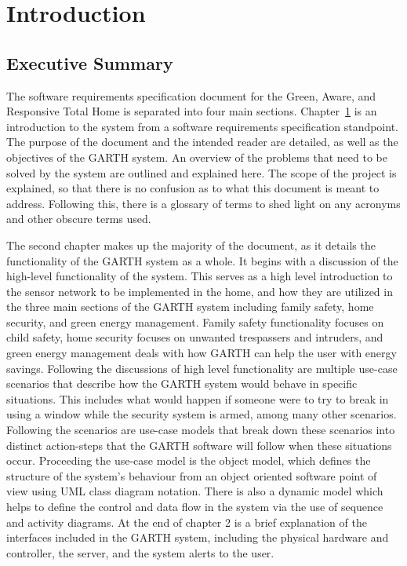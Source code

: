 \documentclass{report}
\begin{document}

\tableofcontents
\listoffigures

\chapter{Introduction}
\label{ch:introduction}
\section{Executive Summary}
The software requirements specification document for the Green, Aware, and
Responsive Total Home is separated into four main sections.
Chapter~\ref{ch:introduction} is an introduction to the system from a software
requirements specification standpoint. The purpose of the document and the
intended reader are detailed, as well as the objectives of the GARTH system. An
overview of the problems that need to be solved by the system are outlined and
explained here. The scope of the project is explained, so that there is no
confusion as to what this document is meant to address. Following this, there
is a glossary of terms to shed light on any acronyms and other obscure terms
used.

The second chapter makes up the majority of the document, as it details the
functionality of the GARTH system as a whole. It begins with a discussion of
the high-level functionality of the system. This serves as a high level
introduction to the sensor network to be implemented in the home, and how they
are utilized in the three main sections of the GARTH system including family
safety, home security, and green energy management. Family safety functionality
focuses on child safety, home security focuses on unwanted trespassers and
intruders, and green energy management deals with how GARTH can help the user
with energy savings. Following the discussions of high level functionality are
multiple use-case scenarios that describe how the GARTH system would behave in
specific situations. This includes what would happen if someone were to try to
break in using a window while the security system is armed, among many other
scenarios. Following the scenarios are use-case models that break down these
scenarios into distinct action-steps that the GARTH software will follow when
these situations occur. Proceeding the use-case model is the object model,
which defines the structure of the system's behaviour from an object oriented
software point of view using UML class diagram notation. There is also a
dynamic model which helps to define the control and data flow in the system via
the use of sequence and activity diagrams. At the end of chapter 2 is a brief
explanation of the interfaces included in the GARTH system, including the
physical hardware and controller, the server, and the system alerts to the
user.
\end{document}
